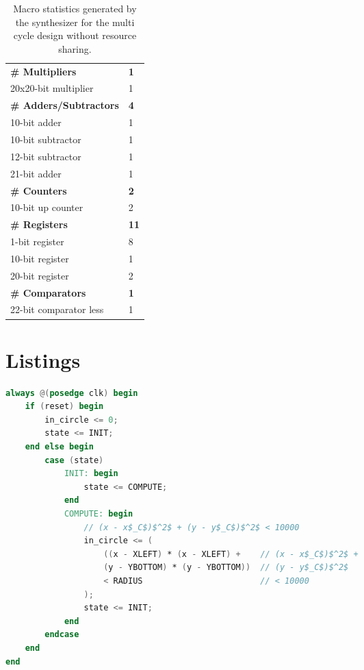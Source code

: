 \documentclass[paper=usletter, fontsize=12pt]{article}
\begin{document}
        \begin{table}[h]
            \caption{Macro statistics generated by the synthesizer for the
            multi cycle design without resource sharing.}
            \label{table:multimacro}
            \centering
            \begin{tabular*}{250pt}{ m{20em}m{1cm} }
            \textbf{\# Multipliers}         & \textbf{1} \\
             20x20-bit multiplier           & 1 \\
            \textbf{\# Adders/Subtractors}  & \textbf{4} \\
             10-bit adder                   & 1 \\
             10-bit subtractor              & 1 \\
             12-bit subtractor              & 1 \\
             21-bit adder                   & 1 \\
            \textbf{\# Counters}            & \textbf{2} \\
             10-bit up counter              & 2 \\
            \textbf{\# Registers}           & \textbf{11} \\
             1-bit register                 & 8 \\
             10-bit register                & 1 \\
             20-bit register                & 2 \\
            \textbf{\# Comparators}         & \textbf{1} \\
             22-bit comparator less         & 1 \\
            \end{tabular*}

        \end{table}

\newpage
\section{Listings}
\begin{lstlisting}[language=Verilog, caption=Single Cycle Computation State Machine]
always @(posedge clk) begin
    if (reset) begin
        in_circle <= 0;
        state <= INIT;
    end else begin
        case (state)
            INIT: begin
                state <= COMPUTE;
            end
            COMPUTE: begin
                // (x - x$_C$)$^2$ + (y - y$_C$)$^2$ < 10000
                in_circle <= (
                    ((x - XLEFT) * (x - XLEFT) +    // (x - x$_C$)$^2$ +
                    (y - YBOTTOM) * (y - YBOTTOM))  // (y - y$_C$)$^2$
                    < RADIUS                        // < 10000
                );
                state <= INIT;
            end
        endcase
    end
end
\end{lstlisting}
\end{document}
